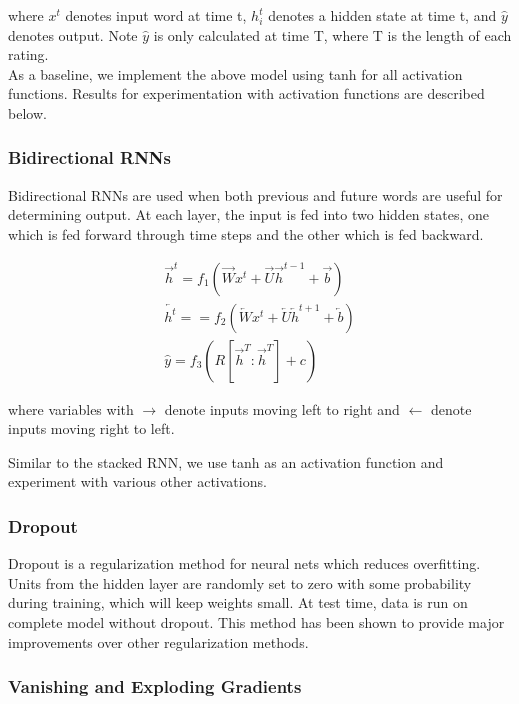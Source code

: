 \documentclass{article} %
\begin{document}
where $x^t$ denotes input word at time t, $h_i^t$ denotes a hidden state at time t, and $\hat{y}$ denotes output. Note $\hat{y}$ is only calculated at time T, where T is the length of each rating. \\

As a baseline, we implement the above model using tanh for all activation functions. Results for experimentation with activation functions are described below. 

\subsubsection{Bidirectional RNNs}

Bidirectional RNNs are used when both previous and future words are useful for determining output. At each layer, the input is fed into two hidden states, one which is fed forward through time steps and the other which is fed backward. 

\begin{gather}
\overrightarrow{h}^t = f_1(\overrightarrow{W} x^t + \overrightarrow{U} \overrightarrow{h}^{t-1} + \overrightarrow{b}) \\
\overleftarrow{h^t} = = f_2(\overleftarrow{W} x^t + \overleftarrow{U} \overleftarrow{h}^{t+1} + \overleftarrow{b}) \\ 
\hat{y} = f_3(R[\overrightarrow{h}^T:\overrightarrow{h}^T] + c)
\end{gather}

where variables with $\rightarrow$ denote inputs moving left to right and $\leftarrow$ denote inputs moving right to left. 

Similar to the stacked RNN, we use tanh as an activation function and experiment with various other activations.

\subsubsection{Dropout}

Dropout is a regularization method for neural nets which reduces overfitting. Units from the hidden layer are randomly set to zero with some probability during training, which will keep weights small. At test time, data is run on complete model without dropout. This method has been shown to provide major improvements over other regularization methods.

\subsubsection{Vanishing and Exploding Gradients}
\end{document}
